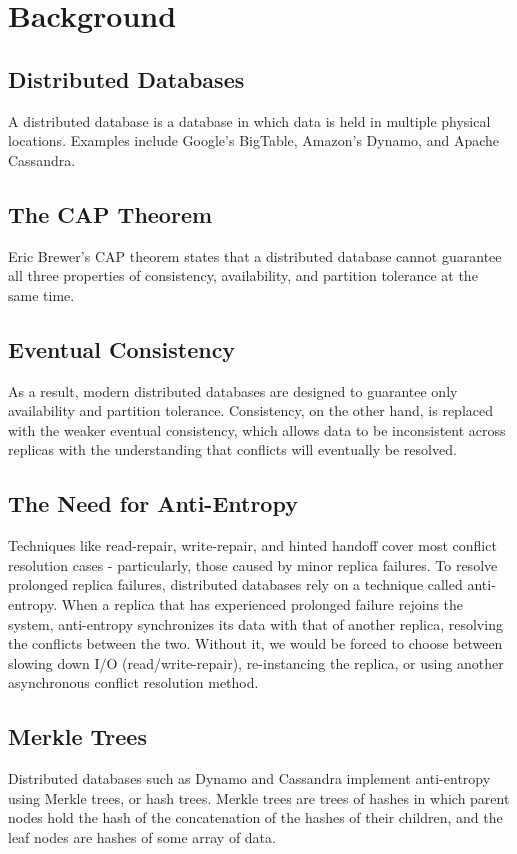\documentclass[11pt,letterpaper]{article}
\begin{document}
\section{Background}

\subsection{Distributed Databases}
A distributed database is a database in which data is held in multiple physical locations. Examples include Google's BigTable\cite{Chang:2008:BDS:1365815.1365816}, Amazon's Dynamo\cite{DeCandia:2007:DAH:1323293.1294281}, and Apache Cassandra\cite{Lakshman:2010:CDS:1773912.1773922}.

\subsection{The CAP Theorem}
Eric Brewer's CAP theorem states that a distributed database cannot guarantee all three properties of consistency, availability, and partition tolerance at the same time.

\subsection{Eventual Consistency}
As a result, modern distributed databases are designed to guarantee only availability and partition tolerance. Consistency, on the other hand, is replaced with the weaker eventual consistency\cite{Vogels:2009:EC:1435417.1435432}, which allows data to be inconsistent across replicas with the understanding that conflicts will eventually be resolved.

\subsection{The Need for Anti-Entropy}
Techniques like read-repair, write-repair, and hinted handoff cover most conflict resolution cases - particularly, those caused by minor replica failures. To resolve prolonged replica failures, distributed databases rely on a technique called anti-entropy. When a replica that has experienced prolonged failure rejoins the system, anti-entropy synchronizes its data with that of another replica, resolving the conflicts between the two. Without it, we would be forced to choose between slowing down I/O (read/write-repair), re-instancing the replica, or using another asynchronous conflict resolution method.

\subsection{Merkle Trees}
Distributed databases such as Dynamo and Cassandra implement anti-entropy using Merkle trees, or hash trees. Merkle trees are trees of hashes in which parent nodes hold the hash of the concatenation of the hashes of their children, and the leaf nodes are hashes of some array of data.
\end{document}
